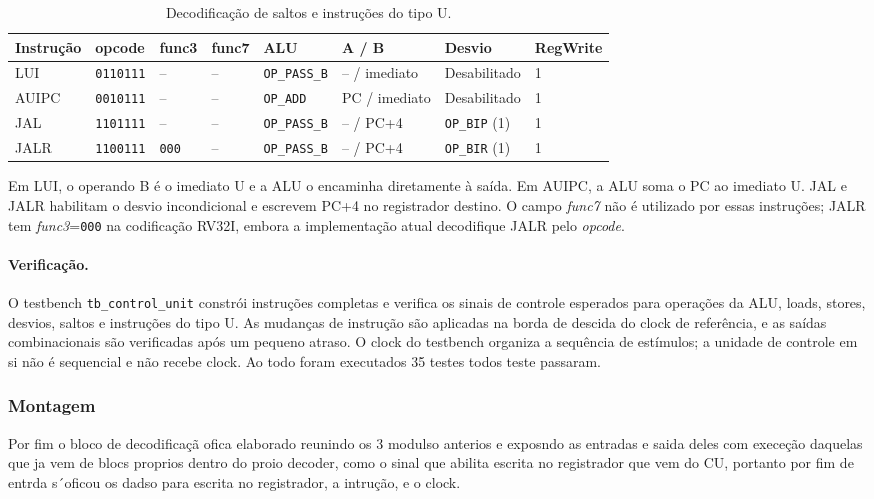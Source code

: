 \begin{table}[!htb]
\centering
\small
\caption{Decodificação de saltos e instruções do tipo U.}
\label{tab:control-unit-jump-upper-decode}
\begin{tabular}{llllllll}
\toprule
\textbf{Instrução} & \textbf{opcode} & \textbf{func3} & \textbf{func7} & \textbf{ALU} & \textbf{A / B} & \textbf{Desvio} & \textbf{RegWrite} \\
\midrule
LUI   & \texttt{0110111} & -- & -- & \texttt{OP\_PASS\_B} & -- / imediato & Desabilitado & 1 \\
AUIPC & \texttt{0010111} & -- & -- & \texttt{OP\_ADD}    & PC / imediato & Desabilitado & 1 \\
JAL   & \texttt{1101111} & -- & -- & \texttt{OP\_PASS\_B} & -- / PC+4 & \texttt{OP\_BIP} (1) & 1 \\
JALR  & \texttt{1100111} & \texttt{000} & -- & \texttt{OP\_PASS\_B} & -- / PC+4 & \texttt{OP\_BIR} (1) & 1 \\
\bottomrule
\end{tabular}
\end{table}

Em LUI, o operando B é o imediato U e a ALU o encaminha diretamente à saída. Em AUIPC, a ALU soma o PC ao imediato U. JAL e JALR habilitam o desvio incondicional e escrevem PC+4 no registrador destino. O campo \textit{func7} não é utilizado por essas instruções; JALR tem \textit{func3}=\texttt{000} na codificação RV32I, embora a implementação atual decodifique JALR pelo \textit{opcode}.

\paragraph{Verificação.}
O testbench \texttt{tb\_control\_unit} constrói instruções completas e verifica os sinais de controle esperados para operações da ALU, loads, stores, desvios, saltos e instruções do tipo U. As mudanças de instrução são aplicadas na borda de descida do clock de referência, e as saídas combinacionais são verificadas após um pequeno atraso. O clock do testbench organiza a sequência de estímulos; a unidade de controle em si não é sequencial e não recebe clock. Ao todo foram executados 
35 testes todos teste passaram.


\subsubsection{Montagem}
\label{subsub:montagem}

Por fim o bloco de decodificaçã ofica elaborado reunindo os 3 modulso anterios e exposndo as entradas e saida deles com execeção daquelas que ja vem de blocs proprios dentro do proio decoder, como o sinal que abilita escrita no registrador  que vem do CU, portanto por fim de entrda s´oficou os dadso para escrita no registrador, a intrução, e o clock.

